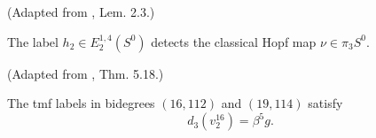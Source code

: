 \begin{theorem}
\label{frontier:Literature:64496b8f7295}
(Adapted from \cite{Adams58}, Lem. 2.3.)\par{}

The label $h_2\in E_2^{1,4}(S^0)$ detects the classical Hopf map $\nu\in\pi_3S^0$.
\end{theorem}

\begin{theorem}
\label{frontier:Literature:6c63a4b40657}
(Adapted from \cite{BR21}, Thm. 5.18.)\par{}

The tmf labels in bidegrees $(16,112)$ and $(19,114)$ satisfy\[d_3(v_2^{16})=\beta^5g.\]
\end{theorem}

